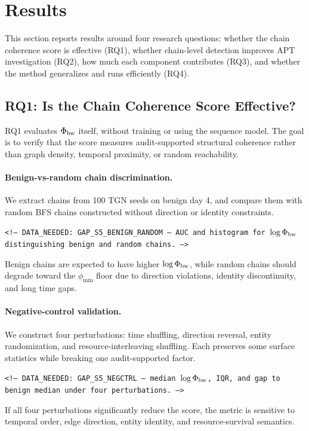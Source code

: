 \section{Results}
\label{sec:evaluation}

This section reports results around four research questions: whether the chain coherence score is effective (RQ1), whether chain-level detection improves APT investigation (RQ2), how much each component contributes (RQ3), and whether the method generalizes and runs efficiently (RQ4).

\subsection{RQ1: Is the Chain Coherence Score Effective?}
\label{sec:metric}

RQ1 evaluates $\Phi_{\text{bw}}$ itself, without training or using the sequence model. The goal is to verify that the score measures audit-supported structural coherence rather than graph density, temporal proximity, or random reachability.

\paragraph{Benign-vs-random chain discrimination.} We extract chains from 100 TGN seeds on benign day 4, and compare them with random BFS chains constructed without direction or identity constraints.
\begin{flushleft}\small\texttt{<!-- DATA\_NEEDED: GAP\_S5\_BENIGN\_RANDOM --- AUC and histogram for $\log\Phi_{\text{bw}}$ distinguishing benign and random chains. -->}\end{flushleft}
Benign chains are expected to have higher $\log\Phi_{\text{bw}}$, while random chains should degrade toward the $\phi_{\min}$ floor due to direction violations, identity discontinuity, and long time gaps.

\paragraph{Negative-control validation.} We construct four perturbations: time shuffling, direction reversal, entity randomization, and resource-interleaving shuffling. Each preserves some surface statistics while breaking one audit-supported factor.
\begin{flushleft}\small\texttt{<!-- DATA\_NEEDED: GAP\_S5\_NEGCTRL --- median $\log\Phi_{\text{bw}}$, IQR, and gap to benign median under four perturbations. -->}\end{flushleft}
If all four perturbations significantly reduce the score, the metric is sensitive to temporal order, edge direction, entity identity, and resource-survival semantics.


